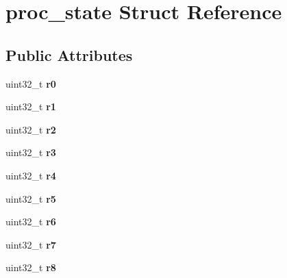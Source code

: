 \hypertarget{structproc__state}{}\section{proc\+\_\+state Struct Reference}
\label{structproc__state}
\subsection*{Public Attributes}
\begin{DoxyCompactItemize}
\item 
\mbox{\label{structproc__state_a25aff8d6e944a300be5817ad7581d5ec}} 
uint32\+\_\+t {\bfseries r0}
\item 
\mbox{\label{structproc__state_a0760e7f2a137ec4f27e1589830c81529}} 
uint32\+\_\+t {\bfseries r1}
\item 
\mbox{\label{structproc__state_a7e7b48a5cd08a819453c0669d419d50c}} 
uint32\+\_\+t {\bfseries r2}
\item 
\mbox{\label{structproc__state_ab0971f6db0dc81303650ae57bc7e8513}} 
uint32\+\_\+t {\bfseries r3}
\item 
\mbox{\label{structproc__state_a38b3a9d8d764b71b386383d7de412636}} 
uint32\+\_\+t {\bfseries r4}
\item 
\mbox{\label{structproc__state_ac53fd2683b880abfb88d4b7ff6a810dc}} 
uint32\+\_\+t {\bfseries r5}
\item 
\mbox{\label{structproc__state_a674b95758b41cd18427b2cae7213feca}} 
uint32\+\_\+t {\bfseries r6}
\item 
\mbox{\label{structproc__state_a3d10b961d88ea1be0a26a64dbf5f8f15}} 
uint32\+\_\+t {\bfseries r7}
\item 
\mbox{\label{structproc__state_a7774cbca4e0581e6b83a614e68b75212}} 
uint32\+\_\+t {\bfseries r8}
\item 
\mbox{\label{structproc__state_a9dd8c875873e7c1c42a30524eb1c58a7}} 

\end{DoxyCompactItemize}
